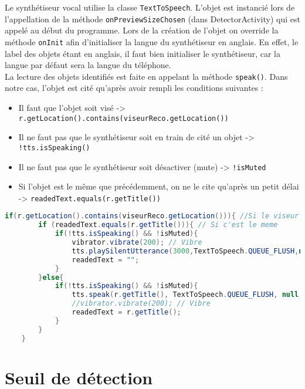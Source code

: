 \documentclass[UTF8]{EPURapport}
\begin{document}
Le synthétiseur vocal utilise la classe \verb|TextToSpeech|. L'objet est instancié lors de l'appellation de la méthode \verb|onPreviewSizeChosen| (dans DetectorActivity) qui est appelé au début du programme. Lors de la création de l'objet on override la méthode \verb|onInit| afin d'initialiser la langue du synthétiseur en anglais. En effet, le label des objets étant en anglais, il faut bien initialiser le synthétiseur, car la langue par défaut sera la langue du téléphone.\\

La lecture des objets identifiés est faite en appelant la méthode \verb|speak()|. Dans notre cas, l'objet est cité qu'après avoir rempli les conditions suivantes :\\

\begin{itemize}
	\item Il faut que l'objet soit visé -> \verb|r.getLocation().contains(viseurReco.getLocation())|
	\item Il ne faut pas que le synthétiseur soit en train de cité un objet ->  \verb|!tts.isSpeaking()|
	\item Il ne faut pas que le synthétiseur soit désactiver (mute) -> \verb|!isMuted|
	\item Si l'objet est le même que précédemment, on ne le cite qu'après un petit délai\\ -> \verb|readedText.equals(r.getTitle())| \\
  \end{itemize}

\begin{lstlisting}[language=Java]
	if(r.getLocation().contains(viseurReco.getLocation())){ //Si le viseur est dans l'objet detecte && pas le meme
		if (readedText.equals(r.getTitle())){ // Si c'est le meme
			if(!tts.isSpeaking() && !isMuted){
				vibrator.vibrate(200); // Vibre
				tts.playSilentUtterance(3000,TextToSpeech.QUEUE_FLUSH,null);
				readedText = "";
			}
		}else{
			if(!tts.isSpeaking() && !isMuted){
				tts.speak(r.getTitle(), TextToSpeech.QUEUE_FLUSH, null, null); // Synthetiseur prononce le label de l'objet
				//vibrator.vibrate(200); // Vibre
				readedText = r.getTitle();
			}
		}
	}
\end{lstlisting}

\section{Seuil de détection}
\end{document}
